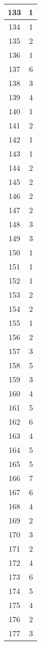\documentclass[letterpaper, 12pt]{article}
\begin{document}
\begin{longtable}{|c|c|}
\hline
133 & 1 \\
\hline
134 & 1 \\
\hline
135 & 2 \\
\hline
136 & 1 \\
\hline
137 & 6 \\
\hline
138 & 3 \\
\hline
139 & 4 \\
\hline
140 & 1 \\
\hline
141 & 2 \\
\hline
142 & 1 \\
\hline
143 & 1 \\
\hline
144 & 2 \\
\hline
145 & 2 \\
\hline
146 & 2 \\
\hline
147 & 2 \\
\hline
148 & 3 \\
\hline
149 & 3 \\
\hline
150 & 1 \\
\hline
151 & 1 \\
\hline
152 & 1 \\
\hline
153 & 2 \\
\hline
154 & 2 \\
\hline
155 & 1 \\
\hline
156 & 2 \\
\hline
157 & 3 \\
\hline
158 & 5 \\
\hline
159 & 3 \\
\hline
160 & 4 \\
\hline
161 & 5 \\
\hline
162 & 6 \\
\hline
163 & 4 \\
\hline
164 & 5 \\
\hline
165 & 5 \\
\hline
166 & 7 \\
\hline
167 & 6 \\
\hline
168 & 4 \\
\hline
169 & 2 \\
\hline
170 & 3 \\
\hline
171 & 2 \\
\hline
172 & 4 \\
\hline
173 & 6 \\
\hline
174 & 5 \\
\hline
175 & 4 \\
\hline
176 & 2 \\
\hline
177 & 3 \\

\end{longtable}
\end{document}
